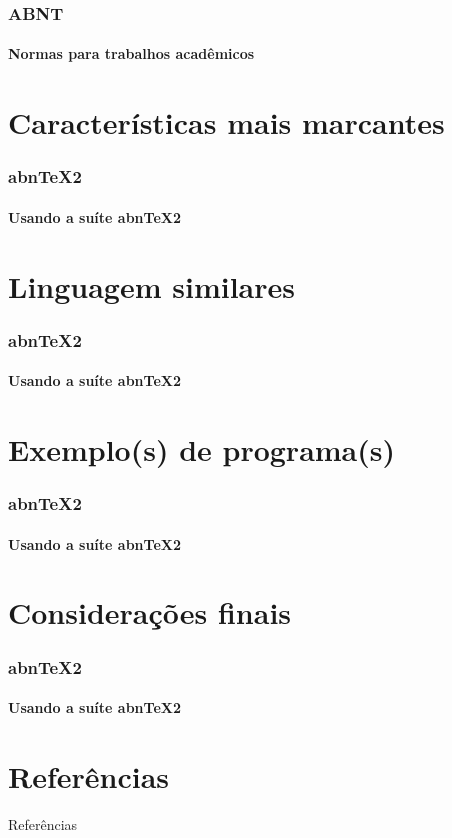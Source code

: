 \documentclass[aspectratio=169]{beamer}
\begin{document}
    \begin{frame}
      \frametitle{ABNT}
      \framesubtitle{Normas para trabalhos acadêmicos}
    \end{frame}

    \section{Características mais marcantes}

    \begin{frame}
      \frametitle{abnTeX2}
      \framesubtitle{Usando a suíte abnTeX2}
    \end{frame}

    \section{Linguagem similares}

    \begin{frame}
      \frametitle{abnTeX2}
      \framesubtitle{Usando a suíte abnTeX2}
    \end{frame}

    \section{Exemplo(s) de programa(s)}

    \begin{frame}
      \frametitle{abnTeX2}
      \framesubtitle{Usando a suíte abnTeX2}
    \end{frame}

    \section{Considerações finais}

    \begin{frame}
      \frametitle{abnTeX2}
      \framesubtitle{Usando a suíte abnTeX2}
    \end{frame}

    \section{Referências}


    \begin{frame}[allowframebreaks]{Referências}
      
    \end{frame}

\end{document}
